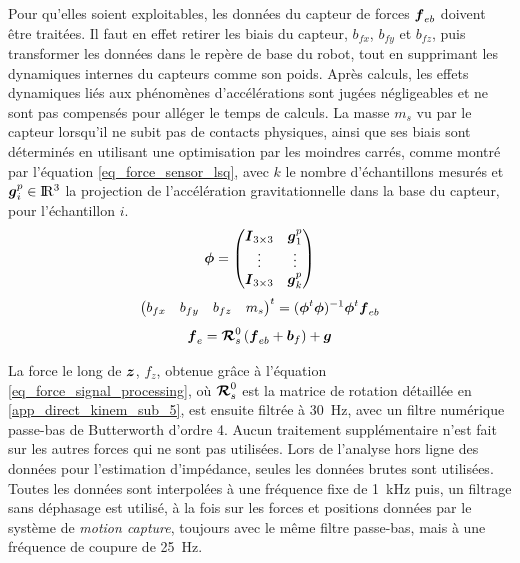 \documentclass[12pt, a4paper]{article} %
\numberwithin{equation}{section}
\begin{document}
\newlineBlank
%
Pour qu'elles soient exploitables, les données du capteur de forces $ \vect{f}_{eb} $ doivent être traitées. Il faut en effet retirer les biais du capteur, $ b_{fx} $, $ b_{fy} $ et $ b_{fz} $, puis transformer les données dans le repère de base du robot, tout en supprimant les dynamiques internes du capteurs comme son poids. Après calculs, les effets dynamiques liés aux phénomènes d'accélérations sont jugées négligeables et ne sont pas compensés pour alléger le temps de calculs. La masse $ m_s $ vu par le capteur lorsqu'il ne subit pas de contacts physiques, ainsi que ses biais sont déterminés en utilisant une optimisation par les moindres carrés, comme montré par l'équation \cref{eq_force_sensor_lsq}, avec $ k $ le nombre d'échantillons mesurés et $ \vect{g}^p_i \in \R^3 $ la projection de l'accélération gravitationnelle dans la base du capteur, pour l'échantillon $ i $.
%
\begin{equation} \label{eq_phi}
	\matr{\phi} = 
	\begin{pmatrix}
	\matr{I}_{3\times3} & \vect{g}^p_1 \\
	\vdots & \vdots \\
	\matr{I}_{3\times3} & \vect{g}^p_k
	\end{pmatrix}
\end{equation}
%
\begin{equation} \label{eq_force_sensor_lsq}
	\begin{pmatrix}
	b_{fx} &
	b_{fy} &
	b_{fz} &
	m_s
	\end{pmatrix}^t
	= (\matr{\phi}^t \matr{\phi})^{-1}\matr{\phi}^t \vect{f}_{eb}
\end{equation}
%
\begin{equation} \label{eq_force_signal_processing}
	\vect{f}_{e} = \matrCal{R}^0_s \left( \vect{f}_{eb} + \vect{b}_f \right) + \vect{g}
\end{equation}

La force le long de $ \vect{z} $, $ f_z $, obtenue grâce à l'équation \cref{eq_force_signal_processing}, où $ \matrCal{R}^0_s $ est la matrice de rotation détaillée en \cref{app_direct_kinem_sub_5}, est ensuite filtrée à \SI{30}{\hertz}, avec un filtre numérique passe-bas de Butterworth d'ordre 4. Aucun traitement supplémentaire n'est fait sur les autres forces qui ne sont pas utilisées.
%
\newlineBlank
%
Lors de l'analyse hors ligne des données pour l'estimation d'impédance, seules les données brutes sont utilisées. Toutes les données sont interpolées à une fréquence fixe de \SI{1}{\kilo\hertz} puis, un filtrage sans déphasage est utilisé, à la fois sur les forces et positions données par le système de \textit{motion capture}, toujours avec le même filtre passe-bas, mais à une fréquence de coupure de \SI{25}{\hertz}.
\end{document}
